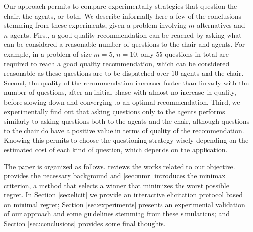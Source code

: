 \documentclass[sigconf, anonymous]{aamas}
\begin{document}
Our approach permits to compare experimentally strategies that question the chair, the agents, or both. We describe informally here a few of the conclusions stemming from these experiments, given a problem involving $m$ alternatives and $n$ agents. First, a good quality recommendation can be reached by asking what can be considered a reasonable number of questions to the chair and agents. For example, in a problem of size $m = 5$, $n = 10$, only $55$ questions in total are required to reach a good quality recommendation, which can be considered reasonable as these questions are to be dispatched over $10$ agents and the chair.
Second, the quality of the recommendation increases faster than linearly with the number of questions, 
after an initial phase with almost no increase in quality, before slowing down and converging to an optimal recommendation. %
Third, we experimentally find out that asking questions only to the agents performs similarly to asking questions both to the agents and the chair, although questions to the chair do have a positive value in terms of quality of the recommendation.
Knowing this permits to choose the questioning strategy wisely depending on the estimated cost of each kind of question, which depends on the application. 

The paper is organized as follows.  reviews the works related to our objective.
 provides the necessary background and \cref{sec:mmr} introduces the minimax criterion, a method that selects a winner that minimizes the worst possible regret.
In Section \ref{sec:elicit} we provide an interactive elicitation protocol based on minimal regret;  Section \ref{sec:experiments} presents an experimental validation of our approach and some guidelines stemming from these simulations; and Section \ref{sec:conclusions} provides some final thoughts.
\end{document}
